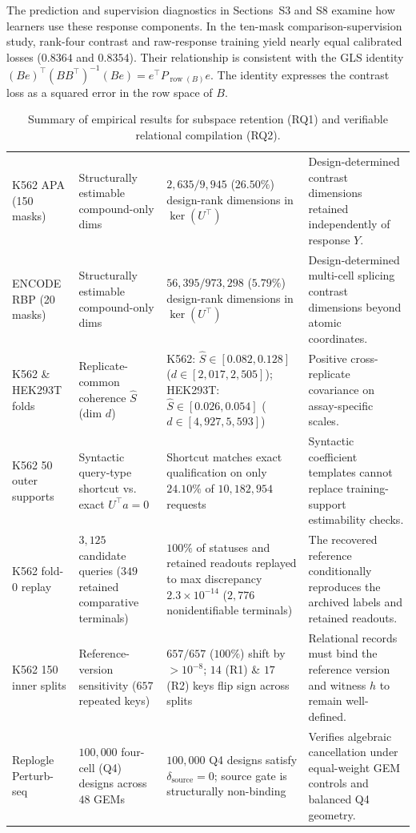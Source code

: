 \documentclass[preprint,12pt,number,sort&compress]{elsarticle}
\begin{document}
The prediction and supervision diagnostics in Sections~S3 and S8 examine how learners use these response components. In the ten-mask comparison-supervision study, rank-four contrast and raw-response training yield nearly equal calibrated losses ($0.8364$ and $0.8354$). Their relationship is consistent with the GLS identity $(Be)^\top(BB^\top)^{-1}(Be)=e^\top P_{\operatorname{row}(B)}e$. The identity expresses the contrast loss as a squared error in the row space of $B$.

\begin{table}[t]
\centering\small{}
\caption{Summary of empirical results for subspace retention (RQ1) and verifiable relational compilation (RQ2).}
\label{tab:rq12_summary}
\begin{tabularx}{\textwidth}{@{}L{0.18\textwidth}L{0.22\textwidth}XX@{}}
\toprule
{} &  &  &  \\ \midrule
K562 APA (150 masks) & Structurally estimable compound-only dims & $2{,}635 / 9{,}945$ ($26.50\%$) design-rank dimensions in $\ker(U^\top)$ & Design-determined contrast dimensions retained independently of response $Y$. \\
ENCODE RBP (20 masks) & Structurally estimable compound-only dims & $56{,}395 / 973{,}298$ ($5.79\%$) design-rank dimensions in $\ker(U^\top)$ & Design-determined multi-cell splicing contrast dimensions beyond atomic coordinates. \\
K562 \& HEK293T folds & Replicate-common coherence $\widehat{S}$ (dim $d$) & K562: $\widehat{S}\in [0.082, 0.128]$ ($d\in [2{,}017, 2{,}505]$); HEK293T: $\widehat{S}\in [0.026, 0.054]$ ($d\in [4{,}927, 5{,}593]$) & Positive cross-replicate covariance on assay-specific scales. \\
\midrule
K562 50 outer supports & Syntactic query-type shortcut vs. exact $U^\top a = 0$ & Shortcut matches exact qualification on only $24.10\%$ of $10{,}182{,}954$ requests & Syntactic coefficient templates cannot replace training-support estimability checks. \\
K562 fold-0 replay & $3{,}125$ candidate queries ($349$ retained comparative terminals) & $100\%$ of statuses and retained readouts replayed to max discrepancy $2.3 \times 10^{-14}$ ($2{,}776$ nonidentifiable terminals) & The recovered reference conditionally reproduces the archived labels and retained readouts. \\
K562 150 inner splits & Reference-version sensitivity ($657$ repeated keys) & $657 / 657$ ($100\%$) shift by $>10^{-8}$; $14$ (R1) \& $17$ (R2) keys flip sign across splits & Relational records must bind the reference version and witness $h$ to remain well-defined. \\
Replogle Perturb-seq & $100{,}000$ four-cell (Q4) designs across $48$ GEMs & $100{,}000$ Q4 designs satisfy $\delta_{\mathrm{source}}=0$; source gate is structurally non-binding & Verifies algebraic cancellation under equal-weight GEM controls and balanced Q4 geometry. \\ \bottomrule
\end{tabularx}
\end{table}
\end{document}

